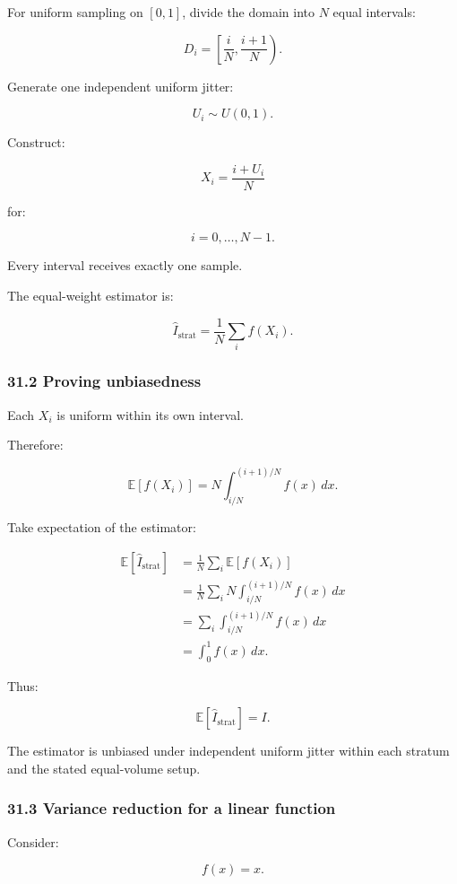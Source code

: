 For uniform sampling on \([0,1]\), divide the domain into \(N\) equal intervals:

\[ D_i= \left[\frac iN,\frac{i+1}{N}\right). \]

Generate one independent uniform jitter:

\[ U_i\sim U(0,1). \]

Construct:

\[ \boxed{ X_i=\frac{i+U_i}{N} } \]

for:

\[ i=0,\ldots,N-1. \]

Every interval receives exactly one sample.

The equal-weight estimator is:

\[ \boxed{ \widehat I_{\mathrm{strat}} = \frac1N\sum_i f(X_i) }. \]

\subsubsection{31.2 Proving unbiasedness}\label{proving-unbiasedness}

Each \(X_i\) is uniform within its own interval.

Therefore:

\[ \mathbb E[f(X_i)] = N\int_{i/N}^{(i+1)/N}f(x)\,dx. \]

Take expectation of the estimator:

\[ \begin{aligned} \mathbb E[\widehat I_{\mathrm{strat}}] &= \frac1N\sum_i\mathbb E[f(X_i)]\\ &= \frac1N\sum_i N\int_{i/N}^{(i+1)/N}f(x)\,dx\\ &= \sum_i\int_{i/N}^{(i+1)/N}f(x)\,dx\\ &= \int_0^1f(x)\,dx. \end{aligned} \]

Thus:

\[ \boxed{ \mathbb E[\widehat I_{\mathrm{strat}}]=I }. \]

The estimator is unbiased under independent uniform jitter within each stratum and the stated equal-volume setup.

\subsubsection{31.3 Variance reduction for a linear function}\label{variance-reduction-for-a-linear-function}

Consider:

\[ f(x)=x. \]

